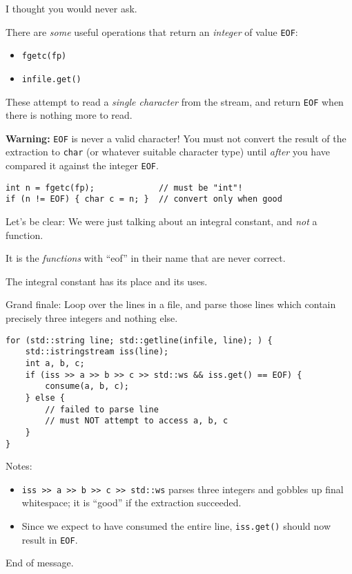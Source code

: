 \documentclass[landscape,a4paper]{article}
\newenvironment{vcframe}{%
\begin{titlepage}
\vspace*{\fill}}{%
\vspace*{\parskip}%
\vspace*{\fill}
\end{titlepage}}
\begin{document}
\begin{vcframe}\center
I thought you would never ask.
\end{vcframe}

\begin{vcframe}
\setlength{\parskip}{1\baselineskip}
There are \emph{some} useful operations that return an \emph{integer} of value \texttt{EOF}:
\begin{itemize}
\item \texttt{fgetc(fp)}
\item \texttt{infile.get()}
\end{itemize}
These attempt to read a \emph{single character} from the stream, and return \texttt{EOF} when there is nothing more to read.

\textbf{Warning:} \texttt{EOF} is never a valid character! You must not convert the result of the extraction to \texttt{char} (or whatever suitable character type) until \emph{after} you have compared it against the integer \texttt{EOF}.
{\small\begin{verbatim}
int n = fgetc(fp);             // must be "int"!
if (n != EOF) { char c = n; }  // convert only when good
\end{verbatim}}
\end{vcframe}

\begin{vcframe}\center
Let's be clear: We were just talking about an integral constant, and \emph{not} a function.

It is the \emph{functions} with ``eof'' in their name that are never correct.

The integral constant has its place and its uses.
\end{vcframe}

\begin{vcframe}
\setlength{\parskip}{1\baselineskip}
Grand finale: Loop over the lines in a file, and parse those lines which contain precisely three integers and nothing else.
{\small\begin{verbatim}
for (std::string line; std::getline(infile, line); ) {
    std::istringstream iss(line);
    int a, b, c;
    if (iss >> a >> b >> c >> std::ws && iss.get() == EOF) {
        consume(a, b, c);
    } else {
        // failed to parse line
        // must NOT attempt to access a, b, c
    }
}
\end{verbatim}}
Notes:\vspace{-1em}
\begin{itemize}
\item \texttt{iss >> a >> b >> c >> std::ws} parses three integers and gobbles up final whitespace; it is ``good'' if the extraction succeeded.
\item Since we expect to have consumed the entire line, \texttt{iss.get()} should now result in \texttt{EOF}.
\end{itemize}
\end{vcframe}

\begin{vcframe}
\centerline{\Large End of message.}
\end{vcframe}
\end{document}
